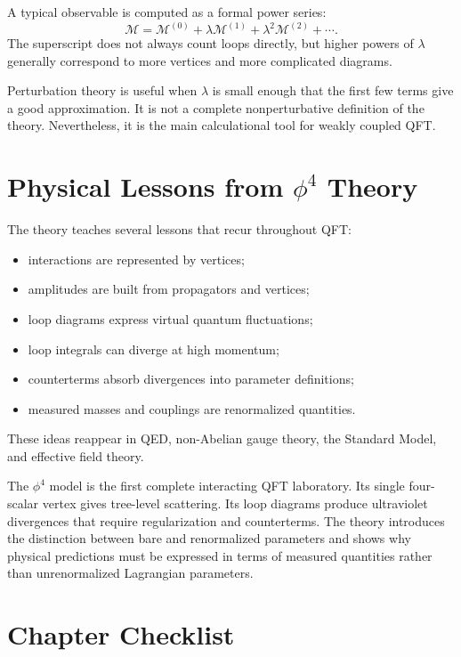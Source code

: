 A typical observable is computed as a formal power series:
\[
    \mathcal{M}
    = \mathcal{M}^{(0)}
      +\lambda\mathcal{M}^{(1)}
      +\lambda^2\mathcal{M}^{(2)}+\cdots.
\]
The superscript does not always count loops directly, but higher powers of
\(\lambda\) generally correspond to more vertices and more complicated diagrams.

Perturbation theory is useful when \(\lambda\) is small enough that the first few
terms give a good approximation. It is not a complete nonperturbative definition
of the theory. Nevertheless, it is the main calculational tool for weakly
coupled QFT.

\section{Physical Lessons from \texorpdfstring{\(\phi^4\)}{phi4} Theory}

The theory teaches several lessons that recur throughout QFT:
\begin{itemize}
    \item interactions are represented by vertices;
    \item amplitudes are built from propagators and vertices;
    \item loop diagrams express virtual quantum fluctuations;
    \item loop integrals can diverge at high momentum;
    \item counterterms absorb divergences into parameter definitions;
    \item measured masses and couplings are renormalized quantities.
\end{itemize}
These ideas reappear in QED, non-Abelian gauge theory, the Standard Model, and
effective field theory.

\begin{summarybox}
The \(\phi^4\) model is the first complete interacting QFT laboratory. Its
single four-scalar vertex gives tree-level scattering. Its loop diagrams produce
ultraviolet divergences that require regularization and counterterms. The theory
introduces the distinction between bare and renormalized parameters and shows why
physical predictions must be expressed in terms of measured quantities rather
than unrenormalized Lagrangian parameters.
\end{summarybox}

\section{Chapter Checklist}

